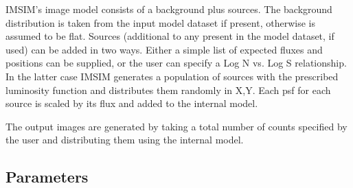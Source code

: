 \documentclass{book}
\renewcommand{\_}{{\tt\char'137}}     %
\begin{document}
IMSIM's image model consists of a background plus sources. The background
distribution is taken from the input model dataset if present, otherwise
is assumed to be flat. Sources (additional to any present in the model
dataset, if used) can be added in two ways. Either a simple list of
expected fluxes and positions can be supplied, or the user can specify
a Log N vs. Log S relationship. In the latter case IMSIM generates a
population of sources with the prescribed luminosity function and
distributes them randomly in X,Y. Each psf for each source is scaled by
its flux and added to the internal model.

The output images are generated by taking a total number of counts
specified by the user and distributing them using the internal model.

\subsection{Parameters}
\end{document}
